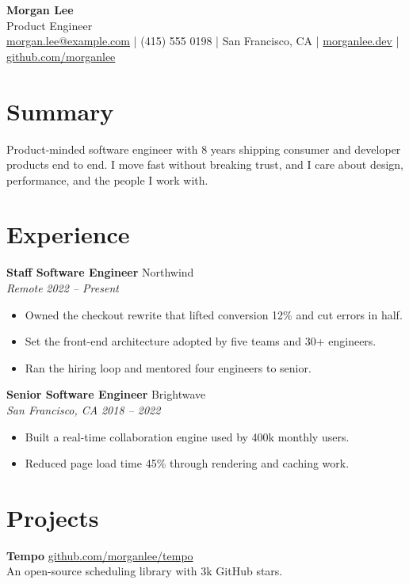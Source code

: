 \documentclass[11pt]{article}
\newcommand{\role}[4]{{\bfseries #1} \hfill #2\\ {\itshape #3} \hfill {\itshape #4}}
\begin{document}
\begin{center}
  {\fontsize{26}{30}\selectfont\bfseries\color{accent} Morgan Lee}\\[3pt]
  {\large Product Engineer}\\[4pt]
  \small
  \href{mailto:morgan.lee@example.com}{morgan.lee@example.com} \; | \;
  (415) 555 0198 \; | \;
  San Francisco, CA \; | \;
  \href{https://morganlee.dev}{morganlee.dev} \; | \;
  \href{https://github.com/morganlee}{github.com/morganlee}
\end{center}
\vspace{4pt}

\section*{Summary}
Product-minded software engineer with 8 years shipping consumer and developer
products end to end. I move fast without breaking trust, and I care about design,
performance, and the people I work with.

\section*{Experience}
\role{Staff Software Engineer}{Northwind}{Remote}{2022 -- Present}
\begin{itemize}
  \item Owned the checkout rewrite that lifted conversion 12\% and cut errors in half.
  \item Set the front-end architecture adopted by five teams and 30+ engineers.
  \item Ran the hiring loop and mentored four engineers to senior.
\end{itemize}
\vspace{3pt}
\role{Senior Software Engineer}{Brightwave}{San Francisco, CA}{2018 -- 2022}
\begin{itemize}
  \item Built a real-time collaboration engine used by 400k monthly users.
  \item Reduced page load time 45\% through rendering and caching work.
\end{itemize}

\section*{Projects}
{\bfseries Tempo} \hfill \href{https://github.com/morganlee/tempo}{github.com/morganlee/tempo}\\
An open-source scheduling library with 3k GitHub stars.
\end{document}
